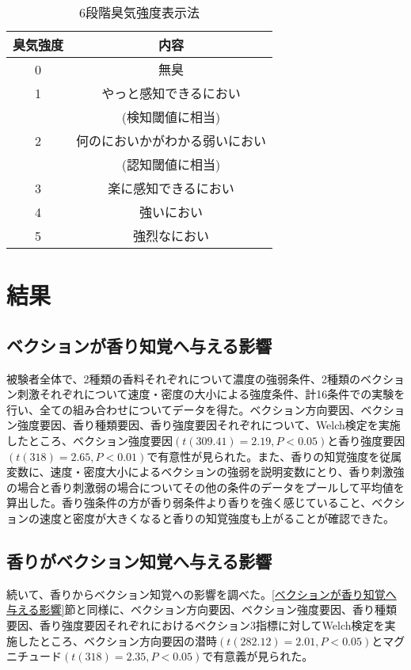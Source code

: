 \documentclass[uplatex]{jsarticle}   %
\begin{document}
\begin{table}[htbp]
 \centering
 \caption{6段階臭気強度表示法}
 \begin{tabular}{|c|c|}\hline
  臭気強度 & 内容 \\ \hline
  0 & 無臭 \\ \hline
  1 & やっと感知できるにおい\\
  & (検知閾値に相当)\\ \hline
  2 & 何のにおいかがわかる弱いにおい \\
  & (認知閾値に相当)\\ \hline
  3 & 楽に感知できるにおい \\ \hline
  4 & 強いにおい \\ \hline
  5 & 強烈なにおい \\ \hline
 \end{tabular}
\end{table}

\section{結果}
\subsection{ベクションが香り知覚へ与える影響}
被験者全体で、2種類の香料それぞれについて濃度の強弱条件、2種類のベクション刺激それぞれについて速度・密度の大小による強度条件、計16条件での実験を行い、全ての組み合わせについてデータを得た。ベクション方向要因、ベクション強度要因、香り種類要因、香り強度要因それぞれについて、Welch検定を実施したところ、ベクション強度要因$(t(309.41)=2.19, P < 0.05)$と香り強度要因$(t(318)=2.65, P < 0.01)$で有意性が見られた。また、香りの知覚強度を従属変数に、速度・密度大小によるベクションの強弱を説明変数にとり、香り刺激強の場合と香り刺激弱の場合についてその他の条件のデータをプールして平均値を算出した。香り強条件の方が香り弱条件より香りを強く感じていること、ベクションの速度と密度が大きくなると香りの知覚強度も上がることが確認できた。

\subsection{香りがベクション知覚へ与える影響}
続いて、香りからベクション知覚への影響を調べた。\ref{ベクションが香り知覚へ与える影響}節と同様に、ベクション方向要因、ベクション強度要因、香り種類要因、香り強度要因それぞれにおけるベクション3指標に対してWelch検定を実施したところ、ベクション方向要因の潜時$(t(282.12)=2.01, P < 0.05)$とマグニチュード$(t(318)=2.35, P < 0.05)$で有意義が見られた。
\end{document}
